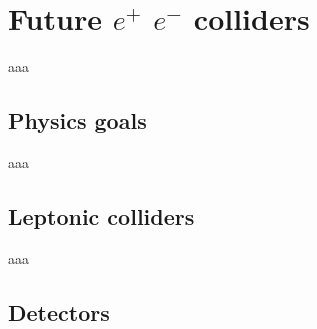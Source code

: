 \chapter{Future $e^+$ $e^-$ colliders}
aaa

\section{Physics goals}
aaa

\section{Leptonic colliders}
aaa

\section{Detectors}